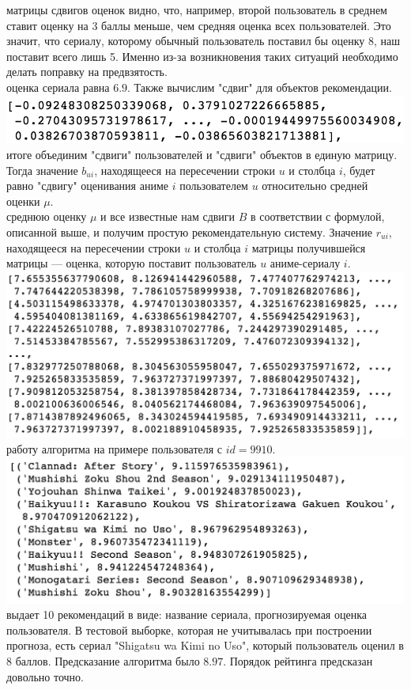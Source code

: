 \documentclass{article}
\newcommand\tab[1][1cm]{\hspace*{#1}}
\begin{document}
 матрицы сдвигов оценок видно, что, например, второй пользователь в среднем ставит оценку на 3 баллы меньше, чем средняя оценка всех пользователей. Это значит, что сериалу, которому обычный пользователь поставил бы оценку 8, наш поставит всего лишь 5. Именно из-за возникновения таких ситуаций необходимо делать поправку на предвзятость.\\
 оценка сериала равна $6.9$. Также вычислим "сдвиг" для объектов рекомендации.\\
\tab\includegraphics[scale=0.8]{f13.png}\\
 итоге объединим "сдвиги" пользователей и "сдвиги" объектов в единую матрицу. Тогда значение $b_{ui}$, находящееся на пересечении строки $u$ и столбца $i$, будет равно "сдвигу" оценивания аниме $i$ пользователем $u$ относительно средней оценки $\mu$.\\
 среднюю оценку $\mu$ и все известные нам сдвиги $B$ в соответствии с формулой, описанной выше, и получим простую рекомендательную систему. Значение $r_{ui}$, находящееся на пересечении строки $u$ и столбца $i$ матрицы получившейся матрицы — оценка, которую поставит пользователь $u$ аниме-сериалу $i$.\\
\tab\includegraphics[scale=0.8]{f14.png}\\
 работу алгоритма на примере пользователя с $id=9910$.\\
\tab\includegraphics[scale=0.8]{f15.png}\\
 выдает 10 рекомендаций в виде: название сериала, прогнозируемая оценка пользователя. В тестовой выборке, которая не учитывалась при построении прогноза, есть сериал "Shigatsu wa Kimi no Uso", который пользователь оценил в $8$ баллов. Предсказание алгоритма было $8.97$. Порядок рейтинга предсказан довольно точно.
\end{document}
